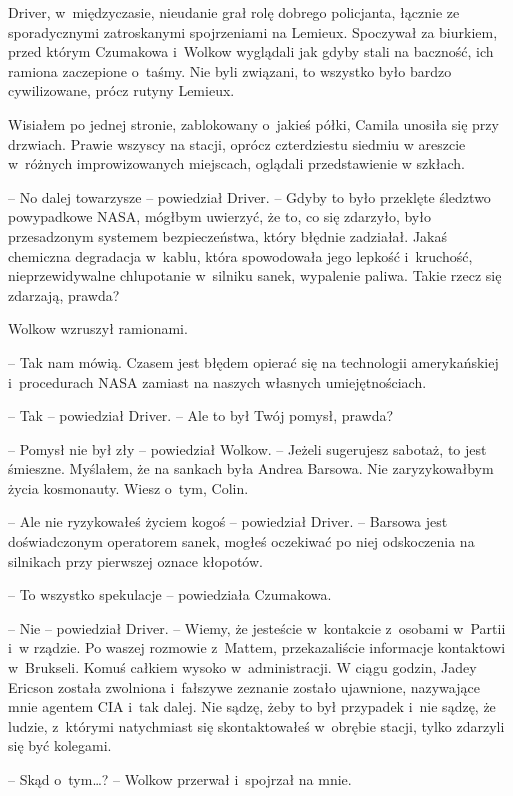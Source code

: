 \documentclass[oneside,polish,12pt,sfheadings]{mwbk}
\begin{document}
Driver, w~międzyczasie, nieudanie grał rolę dobrego policjanta, łącznie
ze sporadycznymi zatroskanymi spojrzeniami na Lemieux. Spoczywał za
biurkiem, przed którym Czumakowa i~Wolkow wyglądali jak gdyby stali na
baczność, ich ramiona zaczepione o~taśmy. Nie byli związani, to wszystko
było bardzo cywilizowane, prócz rutyny Lemieux.

Wisiałem po jednej stronie, zablokowany o~jakieś półki, Camila unosiła
się przy drzwiach. Prawie wszyscy na stacji, oprócz czterdziestu siedmiu
w areszcie w~różnych improwizowanych miejscach, oglądali przedstawienie
w szkłach.

-- No dalej towarzysze -- powiedział Driver. -- Gdyby to było przeklęte
śledztwo powypadkowe NASA, mógłbym uwierzyć, że to, co się zdarzyło,
było przesadzonym systemem bezpieczeństwa, który błędnie zadziałał.
Jakaś chemiczna degradacja w~kablu, która spowodowała jego lepkość i~kruchość, nieprzewidywalne chlupotanie w~silniku sanek, wypalenie
paliwa. Takie rzecz się zdarzają, prawda?

Wolkow wzruszył ramionami. 

-- Tak nam mówią. Czasem jest błędem opierać
się na technologii amerykańskiej i~procedurach NASA zamiast na naszych
własnych umiejętnościach.

-- Tak -- powiedział Driver. -- Ale to był Twój pomysł, prawda?

-- Pomysł nie był zły -- powiedział Wolkow. -- Jeżeli sugerujesz sabotaż,
to jest śmieszne. Myślałem, że na sankach była Andrea Barsowa. Nie
zaryzykowałbym życia kosmonauty. Wiesz o~tym, Colin.

-- Ale nie ryzykowałeś życiem kogoś -- powiedział Driver. -- Barsowa jest
doświadczonym operatorem sanek, mogłeś oczekiwać po niej odskoczenia na
silnikach przy pierwszej oznace kłopotów.

-- To wszystko spekulacje -- powiedziała Czumakowa.

-- Nie -- powiedział Driver. -- Wiemy, że jesteście w~kontakcie z~osobami w~Partii i~w rządzie. Po waszej rozmowie z~Mattem, przekazaliście
informacje kontaktowi w~Brukseli. Komuś całkiem wysoko w~administracji.
W ciągu godzin, Jadey Ericson została zwolniona i~fałszywe zeznanie
zostało ujawnione, nazywające mnie agentem CIA i~tak dalej. Nie sądzę,
żeby to był przypadek i~nie sądzę, że ludzie, z~którymi natychmiast się
skontaktowałeś w~obrębie stacji, tylko zdarzyli się być kolegami.

-- Skąd o~tym\ldots? -- Wolkow przerwał i~spojrzał na mnie.
\end{document}

